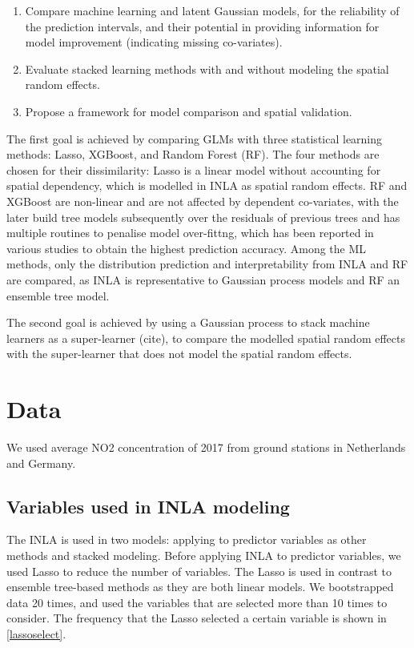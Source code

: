 \documentclass{article}
\begin{document}
\begin{enumerate}
    \item Compare machine learning and latent Gaussian models, for the reliability of the prediction intervals, and their potential in providing information for model improvement (indicating missing co-variates).
    
    \item Evaluate stacked learning methods with and without modeling the spatial random effects.

    \item Propose a framework for model comparison and spatial validation. 
\end{enumerate}

The first goal is achieved by comparing GLMs with three statistical learning methods: Lasso, XGBoost, and Random Forest (RF). The four methods are chosen for their dissimilarity: Lasso is a linear model without accounting for spatial dependency, which is modelled in INLA as spatial random effects. RF and XGBoost are non-linear and are not affected by dependent co-variates, with the later build tree models subsequently over the residuals of previous trees and has multiple routines to penalise model over-fittng, which has been reported in various studies to obtain the highest prediction accuracy. Among the ML methods, only the distribution prediction and interpretability from INLA and RF are compared, as INLA is representative to Gaussian process models and RF an ensemble tree model.

The second goal is achieved by using a Gaussian process to stack machine learners as a super-learner (cite), to compare the modelled spatial random effects with the super-learner that does not model the spatial random effects. 

 
 
\section{Data}
We used average NO2 concentration of 2017 from ground stations in Netherlands and Germany.

\subsection{Variables used in INLA modeling} 
The INLA is used in two models:  applying to predictor variables as other methods and stacked modeling. Before applying INLA to predictor variables, we used Lasso to reduce the number of variables. The Lasso is used in contrast to ensemble tree-based methods as they are both linear models. We bootstrapped data 20 times, and used the variables that are selected more than 10 times to consider. The frequency that the Lasso selected a certain variable is shown in \cref{lassoselect}.
\end{document}
